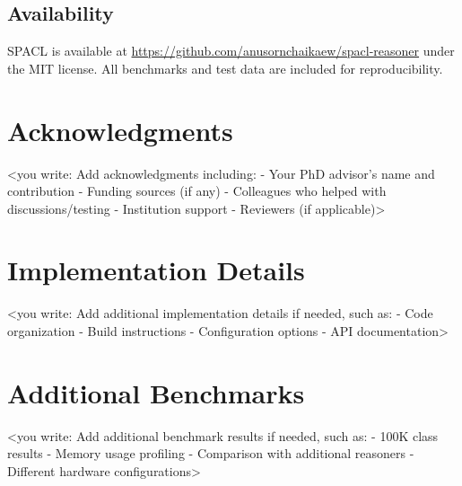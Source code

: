 \documentclass[preprint,12pt]{elsarticle}
\begin{document}
\subsection{Availability}
\label{sec:availability}

SPACL is available at \url{https://github.com/anusornchaikaew/spacl-reasoner} under the MIT license. All benchmarks and test data are included for reproducibility.

\section*{Acknowledgments}
\label{sec:ack}

<you write: Add acknowledgments including:
- Your PhD advisor's name and contribution
- Funding sources (if any)
- Colleagues who helped with discussions/testing
- Institution support
- Reviewers (if applicable)>




\appendix
\section{Implementation Details}
\label{app:implementation}

<you write: Add additional implementation details if needed, such as:
- Code organization
- Build instructions
- Configuration options
- API documentation>

\section{Additional Benchmarks}
\label{app:benchmarks}

<you write: Add additional benchmark results if needed, such as:
- 100K class results
- Memory usage profiling
- Comparison with additional reasoners
- Different hardware configurations>
\end{document}

